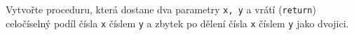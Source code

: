 \question[30]
Vytvořte proceduru, která dostane dva parametry \texttt{x, y} a vrátí
(\texttt{return})
celočíselný podíl čísla \texttt{x} číslem \texttt{y} a zbytek
po dělení čísla
\texttt{x} číslem \texttt{y} jako dvojici.
